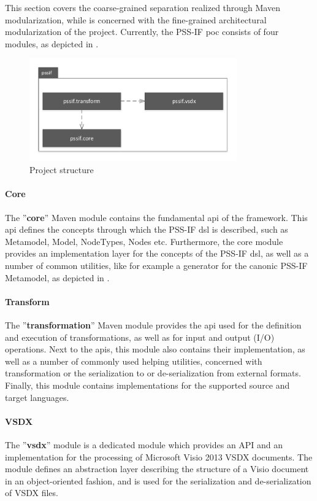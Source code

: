 This section covers the coarse-grained separation realized through Maven modularization, while  is concerned with the fine-grained architectural modularization of the project. Currently, the PSS-IF \gls{poc} consists of four modules, as depicted in  .

\begin{figure}
\centering
\includegraphics[width=0.8\textwidth]{figures/project-structure.pdf}
\caption{Project structure}
\label{fig:structure}
\end{figure}

\paragraph{Core} The ''\textbf{core}'' Maven module contains the fundamental \gls{api} of the framework. This \gls{api} defines the concepts through which the PSS-IF \gls{dsl} is described, such as Metamodel, Model, NodeTypes, Nodes etc. Furthermore, the core module provides an implementation layer for the concepts of the PSS-IF \gls{dsl}, as well as a number of common utilities, like for example a generator for the canonic PSS-IF Metamodel, as depicted in .

\paragraph{Transform} The ''\textbf{transformation}'' Maven module provides the \gls{api} used for the definition and execution of transformations, as well as for input and output (I/O) operations. Next to the \glspl{api}, this module also contains their implementation, as well as a number of commonly used helping utilities, concerned with transformation or the serialization to or de-serialization from external formats. Finally, this module contains implementations for the supported source and target languages.

\paragraph{VSDX} The ''\textbf{vsdx}'' module is a dedicated module which provides an API and an implementation for the processing of Microsoft Visio 2013 VSDX documents. The module defines an abstraction layer describing the structure of a Visio document in an object-oriented fashion, and is used for the serialization and de-serialization of VSDX files.

